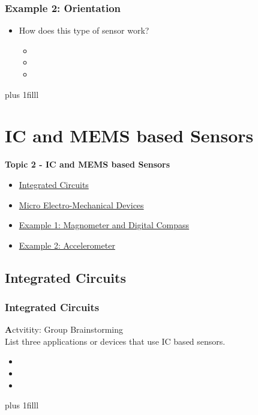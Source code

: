 \documentclass[fleqn]{beamer} %
\newcommand{\sectionIItitle}{IC and MEMS based Sensors}
\newcommand{\sectionIsubsectionVtitle}{Example 2: Orientation}
\newcommand{\sectionIIsubsectionItitle}{Integrated Circuits}
\newcommand{\sectionIIsubsectionIItitle}{Micro Electro-Mechanical Devices}
\newcommand{\sectionIIsubsectionIIItitle}{Example 1: Magnometer and Digital Compass}
\newcommand{\sectionIIsubsectionIVtitle}{Example 2: Accelerometer}
\newcommand{\btVFill}{\vskip0pt plus 1filll}
\begin{document}
			\begin{frame}
				\frametitle{\sectionIsubsectionVtitle}
				\begin{itemize}
					\item How does this type of sensor work?
					\begin{itemize}
						\item \vspace{5mm}
						\item \vspace{5mm}
						\item \vspace{5mm}	
					\end{itemize}
				\end{itemize}
				
				\btVFill

			\end{frame}

	
	\section{\sectionIItitle}\label{sectionII}

		\begin{frame}
			\large \textbf{Topic 2 - \sectionIItitle} \vspace{3mm}\\

			\begin{itemize}
				\item \hyperlink{sectionIIsubsectionI}{\sectionIIsubsectionItitle} \vspc %
				\item \hyperlink{sectionIIsubsectionII}{\sectionIIsubsectionIItitle} \vspc %
				\item \hyperlink{sectionIIsubsectionIII}{\sectionIIsubsectionIIItitle} \vspc %
				\item \hyperlink{sectionIIsubsectionIV}{\sectionIIsubsectionIVtitle} \vspc %
			\end{itemize}

		\end{frame}

		\subsection{\sectionIIsubsectionItitle}\label{sectionIIsubsectionI}

			\begin{frame}[label=sectionIIsubsectionI]
				\frametitle{\sectionIIsubsectionItitle}

				{\textbf Actvitity:} Group Brainstorming \\
				List three applications or devices that use IC based sensors.
				\begin{itemize}
					\item
					\item
					\item
				\end{itemize}
				\btVFill	


			\end{frame}
\end{document}
